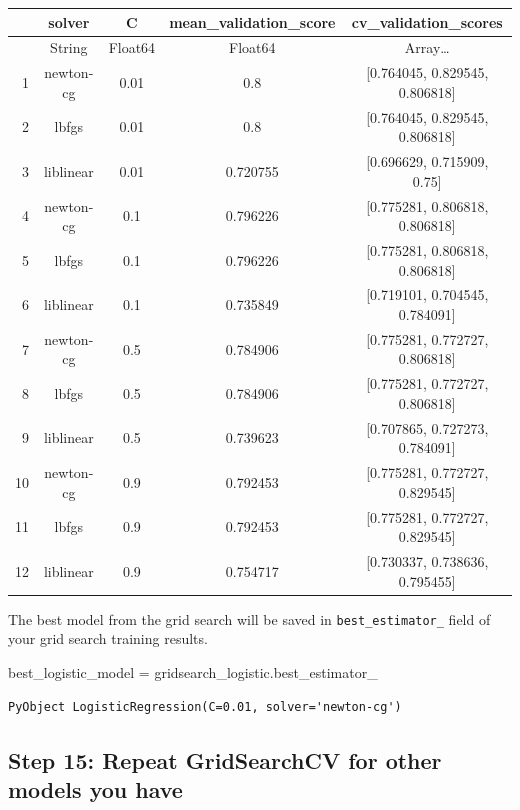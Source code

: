 \documentclass[
  letterpaper,
]{book}
\newenvironment{Shaded}{\begin{snugshade}}{\end{snugshade}}
\newcommand{\NormalTok}[1]{\textcolor[rgb]{0.00,0.23,0.31}{#1}}
\newcommand{\OperatorTok}[1]{\textcolor[rgb]{0.37,0.37,0.37}{#1}}
\begin{document}
\begin{tabular}{r|cccc}
    & solver & C & mean\_validation\_score & cv\_validation\_scores\\
    \hline
    & String & Float64 & Float64 & Array…\\
    \hline
    1 & newton-cg & 0.01 & 0.8 & [0.764045, 0.829545, 0.806818] \\
    2 & lbfgs & 0.01 & 0.8 & [0.764045, 0.829545, 0.806818] \\
    3 & liblinear & 0.01 & 0.720755 & [0.696629, 0.715909, 0.75] \\
    4 & newton-cg & 0.1 & 0.796226 & [0.775281, 0.806818, 0.806818] \\
    5 & lbfgs & 0.1 & 0.796226 & [0.775281, 0.806818, 0.806818] \\
    6 & liblinear & 0.1 & 0.735849 & [0.719101, 0.704545, 0.784091] \\
    7 & newton-cg & 0.5 & 0.784906 & [0.775281, 0.772727, 0.806818] \\
    8 & lbfgs & 0.5 & 0.784906 & [0.775281, 0.772727, 0.806818] \\
    9 & liblinear & 0.5 & 0.739623 & [0.707865, 0.727273, 0.784091] \\
    10 & newton-cg & 0.9 & 0.792453 & [0.775281, 0.772727, 0.829545] \\
    11 & lbfgs & 0.9 & 0.792453 & [0.775281, 0.772727, 0.829545] \\
    12 & liblinear & 0.9 & 0.754717 & [0.730337, 0.738636, 0.795455] \\
\end{tabular}

The best model from the grid search will be saved in
\texttt{best\_estimator\_} field of your grid search training results.

\begin{Shaded}
\begin{Highlighting}[]
\NormalTok{best\_logistic\_model }\OperatorTok{=}\NormalTok{ gridsearch\_logistic.best\_estimator\_}
\end{Highlighting}
\end{Shaded}

\begin{verbatim}
PyObject LogisticRegression(C=0.01, solver='newton-cg')
\end{verbatim}

\hypertarget{step-15-repeat-gridsearchcv-for-other-models-you-have}{%
\subsection*{Step 15: Repeat GridSearchCV for other models you
have}\label{step-15-repeat-gridsearchcv-for-other-models-you-have}}
\end{document}
